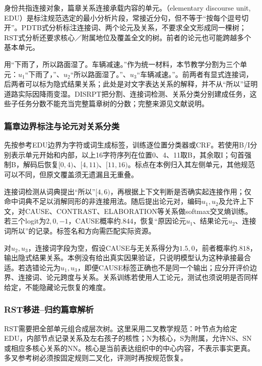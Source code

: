 身份共指连接对象，篇章关系连接承载内容的单元。（elementary discourse unit, EDU）是标注规范选定的最小分析片段，常接近分句，但不等于“按每个逗号切开”。PDTB式分析标注连接词、两个论元及关系，不要求全文形成同一棵树；RST式分析还要求核心／附属地位及覆盖全文的树。前者的论元也可能跨越多个基本单元。

用“下雨了，所以路面湿了。车辆减速。”作为统一材料，本节教学分割为三个单元：$u_1$“下雨了，”、$u_2$“所以路面湿了。”、$u_3$“车辆减速。”。前两者有显式连接词，后两者可以标为隐式结果关系；此处是对文字表达关系的解释，并不从“所以”证明道路实际因降雨变湿。DISRPT把分割、连接词检测、关系分类分别建成任务，这些子任务分数不能充当完整篇章树的分数；完整来源见文献说明。

\subsubsection{篇章边界标注与论元对关系分类}
\label{sec:nlp-analysis-discourse-boundary}

先按参考EDU边界为字符或词生成标签，训练逐位置分类器或CRF。若使用B/I分别表示单元开始和内部，以上16字符序列在位置0、4、11取B，其余取I；句首强制B，解码后恢复$[0,4)$、$[4,11)$、$[11,16)$。标点在本例归入其左侧单元，其他规范可以不同，但原文覆盖须无遗漏且无重叠。

连接词检测从词典提出“所以”$[4,6)$，再根据上下文判断是否确实起连接作用；仅命中词典不足以消解同形的非连接用法。随后提出论元对，编码$u_1,u_2$及允许上下文，对CAUSE、CONTRAST、ELABORATION等关系做softmax交叉熵训练。若三个logit为$2,0,-1$，CAUSE概率约$.844$，恢复“原因论元$u_1$、结果论元$u_2$、连接词所以”的记录。标签名和方向需匹配实际资源。

对$u_2,u_3$，连接词字段为空，假设CAUSE与无关系得分为$1.5,0$，前者概率约$.818$，输出隐式结果关系。本例没有给出真实因果验证，只说明模型认为这种承接最合适。若选错论元为$u_1,u_3$，即便CAUSE标签正确也不是同一个输出；应分开评价边界、连接词、论元跨度与关系。关系训练若使用人工论元，测试也须说明是否同样给定，不能隐藏论元恢复的难度。

\subsubsection{RST移进--归约篇章解析}
\label{sec:nlp-analysis-rst-transition}

RST需要把全部单元组合成层次树。这里采用二叉教学规范：叶节点为给定EDU，内部节点记录关系及左右孩子的核性；N为核心，S为附属，允许NS、SN或相应多核心关系的NN。核心是当前表达组织中的中心内容，不表示事实更真。多叉参考树必须按固定规则二叉化，评测时再按规范恢复。

